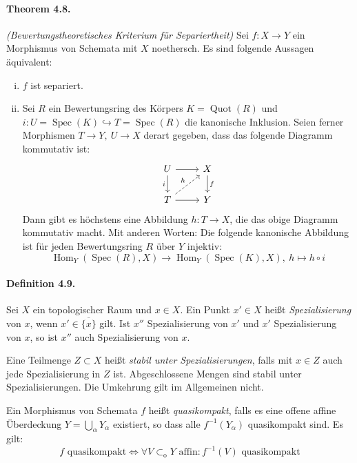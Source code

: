 \paragraph{Theorem 4.8.}\label{4.8} \textit{(Bewertungstheoretisches Kriterium für Separiertheit)} Sei $f:X\to Y$ ein Morphismus von Schemata mit $X$ noethersch. Es sind folgende Aussagen äquivalent:
\begin{enumerate}[(i)]
\item $f$ ist separiert.
\item Sei $R$ ein Bewertungsring des Körpers $K=\operatorname{Quot}(R)$ und $i:U=\operatorname{Spec}(K)\hookrightarrow T=\operatorname{Spec}(R)$ die kanonische Inklusion. Seien ferner Morphismen $T\to Y,\ U\to X$ derart gegeben, dass das folgende Diagramm kommutativ ist:
\[\begin{tikzcd}
U\ar[r]\ar[d, "i"'] & X\ar[d, "f"]\\
T\ar[r]\ar[ur, "h", dashed] & Y
\end{tikzcd}\]
Dann gibt es höchstens eine Abbildung $h:T\to X$, die das obige Diagramm kommutativ macht. Mit anderen Worten: Die folgende kanonische Abbildung ist für jeden Bewertungsring $R$ über $Y$ injektiv:
\[\operatorname{Hom}_Y(\operatorname{Spec}(R),X)\to\operatorname{Hom}_Y(\operatorname{Spec}(K),X),\ h\mapsto h\circ i \]
\end{enumerate}

\paragraph{Definition 4.9.}\label{4.9}  Sei $X$ ein topologischer Raum und $x\in X$. Ein Punkt $x'\in X$ heißt \textit{Spezialisierung} von $x$, wenn $x'\in\overline{\{x\}}$ gilt. Ist $x''$ Spezialisierung von $x'$ und $x'$ Spezialisierung von $x$, so ist $x''$ auch Spezialisierung von $x$.

Eine Teilmenge $Z\subset X$ heißt \textit{stabil unter Spezialisierungen}, falls mit $x\in Z$ auch jede Spezialisierung in $Z$ ist. Abgeschlossene Mengen sind stabil unter Spezialisierungen. Die Umkehrung gilt im Allgemeinen nicht.

Ein Morphismus von Schemata $f$ heißt \textit{quasikompakt}, falls es eine offene affine Ü\-ber\-deckung $Y=\bigcup_\alpha Y_\alpha$ existiert, so dass alle $f^{-1}(Y_\alpha)$ quasikompakt sind. Es gilt:
\[f\text{ quasikompakt}\iff\forall V\subset_\text{o}Y\text{ affin}\colon f^{-1}(V)\text{ quasikompakt} \]

